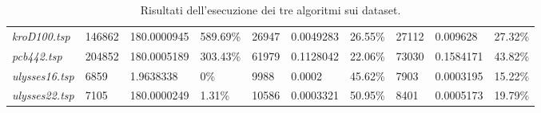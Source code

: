 \begin{landscape}
\begin{table}[]
\begin{tabular}{llllllllll}
  \textit{kroD100.tsp}                                  & 146862                                 & 180.0000945                                                                          & 589.69\%                                                                               & 26947                                  & 0.0049283                                                                             & 26.55\%                                                                                & 27112                                  & 0.009628                                                                             & 27.32\%                                                                                \\
  \textit{pcb442.tsp}                                   & 204852                                 & 180.0005189                                                                          & 303.43\%                                                                               & 61979                                  & 0.1128042                                                                             & 22.06\%                                                                                & 73030                                  & 0.1584171                                                                            & 43.82\%                                                                                \\
  \textit{ulysses16.tsp}                                & 6859                                   & 1.9638338                                                                            & 0\%                                                                                    & 9988                                   & 0.0002                                                                                & 45.62\%                                                                                & 7903                                   & 0.0003195                                                                            & 15.22\%                                                                                \\
  \textit{ulysses22.tsp}                                & 7105                                   & 180.0000249                                                                          & 1.31\%                                                                                 & 10586                                  & 0.0003321                                                                             & 50.95\%                                                                                & 8401                                   & 0.0005173                                                                            & 19.79\%                                                                               
  \end{tabular}
  \caption{Risultati dell'esecuzione dei tre algoritmi sui dataset.}
  \label{tab:results}
  \end{table}

\end{landscape}

